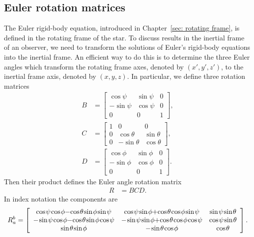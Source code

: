 \documentclass[../full_thesis/full_thesis.tex]{subfiles}
\begin{document}
\subsection{Euler rotation matrices}
\label{sec: euler rotation matrices}
The Euler rigid-body equation, introduced in Chapter~\ref{sec: rotating frame},
is defined in the rotating frame of the star. To discuss results in the
inertial frame of an observer, we need to transform the solutions of Euler's
rigid-body equations into the inertial frame.  An efficient way to do this is
to determine the three Euler angles which transform the rotating frame axes,
denoted by $(x',y', z')$, to the inertial frame axis, denoted by $(x, y, z)$.
In particular, we define three rotation matrices
\begin{align}
B & = \left[\begin{array}{ccc}
\cos\psi & \sin\psi & 0 \\
-\sin\psi & \cos\psi & 0 \\
0 & 0 & 1
\end{array}
\right],
\\
C & =
\left[\begin{array}{ccc}
1 & 0 & 0 \\
0 & \cos\theta & \sin\theta \\
0 & -\sin\theta & \cos\theta
\end{array}
\right], \\
D & = \left[\begin{array}{ccc}
\cos\phi & \sin\phi & 0 \\
-\sin\phi & \cos\phi & 0 \\
0 & 0 & 1
\end{array}
\right].
\end{align}
Then their product defines the Euler angle rotation matrix
\begin{align}
R & = BCD.
\end{align}
In index notation the components are
\begin{align}
\medmuskip=0mu
\thinmuskip=1.5mu
\thickmuskip=0mu
R^{b}_{\;a} = \left[
\begin{array}{ccc}
\cos\psi \cos\phi - \cos\theta \sin\phi \sin \psi &
\cos\psi \sin \phi + \cos\theta \cos \phi \sin \psi &
\sin \psi \sin\theta \\
-\sin\psi \cos\phi - \cos\theta\sin\phi\cos\psi &
-\sin\psi\sin\phi + \cos\theta\cos\phi\cos\psi &
\cos\psi \sin\theta \\
\sin\theta\sin\phi &
-\sin\theta \cos\phi &
\cos\theta
\end{array}
\right].
\label{eqn: rotation matrix}
\end{align}
\end{document}
